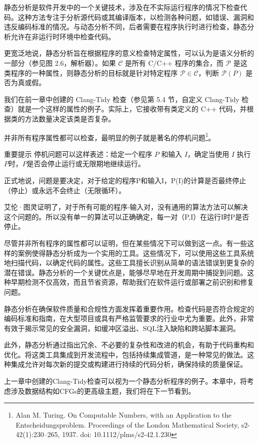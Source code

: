 静态分析是软件开发中的一个关键技术，涉及在不实际运行程序的情况下检查代码。这种方法专注于分析源代码或其编译版本，以检测各种问题，如错误、漏洞和违反编码标准的情况。与动态分析不同，后者需要在程序执行时进行检查，静态分析允许在非运行时环境中检查代码。

更宽泛地说，静态分析旨在根据程序的意义检查特定属性，可以认为是语义分析的一部分（参见图 2.6，解析器）。如果 $\mathcal{C}$ 是所有 C/C++ 程序的集合，而 $\mathcal{P}$ 是这类程序的一种属性，则静态分析的目标就是针对特定程序 $\mathcal{P} \in \mathcal{C}$，判断 $\mathcal{P}(P)$ 是否为真或假。

我们在前一章中创建的 Clang-Tidy 检查（参见第 5.4 节，自定义 Clang-Tidy 检查）就是一个这样的属性的例子。实际上，它接收带有类定义的 C++ 代码，并根据类的方法数量决定该类是否复杂。

并非所有程序属性都可以检查，最明显的例子就是著名的停机问题\footnote{Alan M. Turing. On Computable Numbers, with an Application to the Entscheidungsproblem. Proceedings of the London Mathematical Society, s2-42(1):230–265, 1937. doi: 10.1112/plms/s2-42.1.230}。

\begin{myNotic}{重要提示}
停机问题可以这样表述：给定一个程序 $P$ 和输入 $I$，确定当使用 $I$ 执行 $P$时，$P$是否会停止运行或无限期地继续运行。
\end{myNotic}

正式地说，问题是要决定，对于给定的程序P和输入I，P(I)的计算是否最终停止（停止）或永远不会终止（无限循环）。

艾伦·图灵证明了，对于所有可能的程序-输入对，没有通用的算法方法可以解决这个问题的。所以没有单一的算法可以正确确定，每一对（P,I）在运行I时P是否停止。

尽管并非所有程序的属性都可以证明，但在某些情况下可以做到这一点。有一些这样的案例使得静态分析成为一个实用的工具。这些情况下，可以使用这些工具系统地扫描代码，以确定代码的属性。这些工具擅长识别从简单的语法错误到更复杂的潜在错误。静态分析的一个关键优点是，能够尽早地在开发周期中捕捉到问题。这种早期检测不仅高效，而且节省资源，帮助我们在软件运行或部署之前识别和修复问题。

静态分析在确保软件质量和合规性方面发挥着重要作用。检查代码是否符合规定的编码标准和指南，在大型项目或具有严格监管要求的行业中尤为重要。此外，非常有效于揭示常见的安全漏洞，如缓冲区溢出、SQL注入缺陷和跨站脚本漏洞。

此外，静态分析通过指出冗余、不必要的复杂性和改进的机会，有助于代码重构和优化。将这类工具集成到开发流程中，包括持续集成管道，是一种常见的做法。这种集成允许对每次新的提交或构建进行持续的代码分析，确保持续的质量保证。

上一章中创建的Clang-Tidy检查可以视为一个静态分析程序的例子。本章中，将考虑涉及数据结构如CFGs的更高级主题，我们将在下一节看到。
